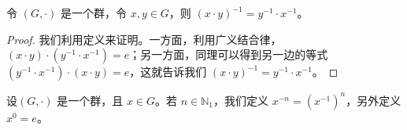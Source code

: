 \documentclass[../../main.tex]{subfiles}
\begin{document}
\begin{proposition}
令 $(G, \cdot)$ 是一个群，令 $x, y \in G$，则 $(x \cdot y)^{-1} = y^{-1} \cdot x^{-1}$。
\end{proposition}
\begin{proof}
我们利用定义来证明。一方面，利用广义结合律，$(x \cdot y) \cdot (y^{-1} \cdot x^{-1}) = e$；另一方面，同理可以得到另一边的等式$(y^{-1} \cdot x^{-1}) \cdot (x \cdot y) = e$，这就告诉我们 $(x \cdot y)^{-1} = y^{-1} \cdot x^{-1}$。 
\end{proof}

\begin{definition}\label{definition:群中元素负幂的定义}
设$(G,\cdot)$ 是一个群，且 $x\in G$。若 $n\in\mathbb{N}_1$，我们定义 $x^{-n}=(x^{-1})^n$，另外定义$x^0 = e$。 
\end{definition}
\end{document}
